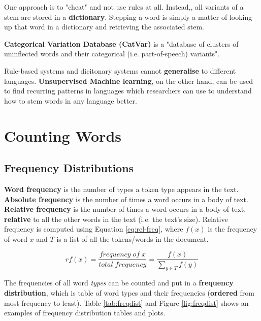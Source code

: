 \documentclass{article}
\begin{document}
One approach is to "cheat" and not use rules at all. Instead,, all variants of a stem are stored in a \textbf{dictionary}. Stepping a word is simply a matter of looking up that word in a dictionary and retrieving the associated stem.

\textbf{Categorical Variation Database (CatVar)} is a "database of clusters of uninflected words and their categorical (i.e. part-of-speech) variants".

Rule-based systems and dicitonary systems cannot \textbf{generalise} to different languages. \textbf{Unsupervised Machine learning}, on the other hand, can be used to find recurring patterns in languages which researchers can use to understand how to stem words in any language better.

\section{Counting Words}

\subsection{Frequency Distributions}

\textbf{Word frequency} is the number of types a token type appears in the text. \textbf{Absolute frequency} is the number of times a word occurs in a body of text. \textbf{Relative frequency} is the number of times a word occurs in a body of text, \textbf{relative} to all the other words in the text (i.e. the text's size). Relative frequency is computed using Equation \ref{eq:rel-freq}, where $f(x)$ is the frequency of word $x$ and $T$ is a list of all the tokens/words in the document.

\begin{equation}
	rf(x) = \frac{frequency\;of\;x}{total\;frequency} =
	\frac{f(x)}{ \sum_{y \in T} {f(y)} }
	\label{eq:rel-freq}
\end{equation}

The frequencies of all word \textit{types} can be counted and put in a \textbf{frequency distribution}, which is table of word types and their frequencies (\textbf{ordered} from most frequency to least). Table \ref{tab:freqdist} and Figure \ref{fig:freqdist} shows an examples of frequency distribution tables and plots.
\end{document}

